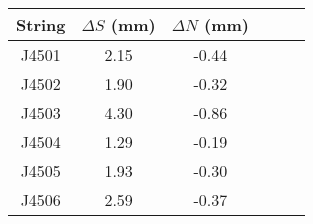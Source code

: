 \begin{tabular}{cccccc}
\toprule
String &  $\Delta S$ (mm) &  $\Delta N$ (mm) \\
\midrule
 J4501 &             2.15 &            -0.44 \\
 J4502 &             1.90 &            -0.32 \\
 J4503 &             4.30 &            -0.86 \\
 J4504 &             1.29 &            -0.19 \\
 J4505 &             1.93 &            -0.30 \\
 J4506 &             2.59 &            -0.37 \\
\bottomrule
\end{tabular}

